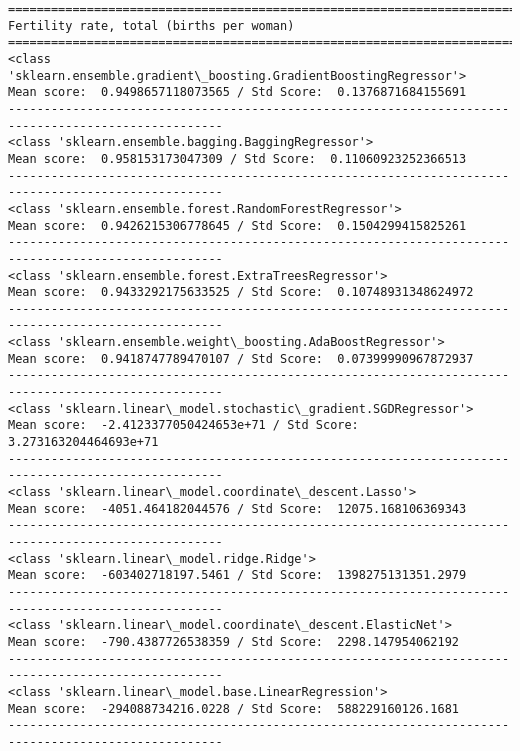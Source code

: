 \documentclass[11pt]{article}
\begin{document}
    \begin{Verbatim}[commandchars=\\\{\}]
====================================================================================================
Fertility rate, total (births per woman)
====================================================================================================
<class 'sklearn.ensemble.gradient\_boosting.GradientBoostingRegressor'>
Mean score:  0.9498657118073565 / Std Score:  0.1376871684155691
----------------------------------------------------------------------------------------------------
<class 'sklearn.ensemble.bagging.BaggingRegressor'>
Mean score:  0.958153173047309 / Std Score:  0.11060923252366513
----------------------------------------------------------------------------------------------------
<class 'sklearn.ensemble.forest.RandomForestRegressor'>
Mean score:  0.9426215306778645 / Std Score:  0.1504299415825261
----------------------------------------------------------------------------------------------------
<class 'sklearn.ensemble.forest.ExtraTreesRegressor'>
Mean score:  0.9433292175633525 / Std Score:  0.10748931348624972
----------------------------------------------------------------------------------------------------
<class 'sklearn.ensemble.weight\_boosting.AdaBoostRegressor'>
Mean score:  0.9418747789470107 / Std Score:  0.07399990967872937
----------------------------------------------------------------------------------------------------
<class 'sklearn.linear\_model.stochastic\_gradient.SGDRegressor'>
Mean score:  -2.4123377050424653e+71 / Std Score:  3.273163204464693e+71
----------------------------------------------------------------------------------------------------
<class 'sklearn.linear\_model.coordinate\_descent.Lasso'>
Mean score:  -4051.464182044576 / Std Score:  12075.168106369343
----------------------------------------------------------------------------------------------------
<class 'sklearn.linear\_model.ridge.Ridge'>
Mean score:  -603402718197.5461 / Std Score:  1398275131351.2979
----------------------------------------------------------------------------------------------------
<class 'sklearn.linear\_model.coordinate\_descent.ElasticNet'>
Mean score:  -790.4387726538359 / Std Score:  2298.147954062192
----------------------------------------------------------------------------------------------------
<class 'sklearn.linear\_model.base.LinearRegression'>
Mean score:  -294088734216.0228 / Std Score:  588229160126.1681
----------------------------------------------------------------------------------------------------

    \end{Verbatim}
\end{document}

